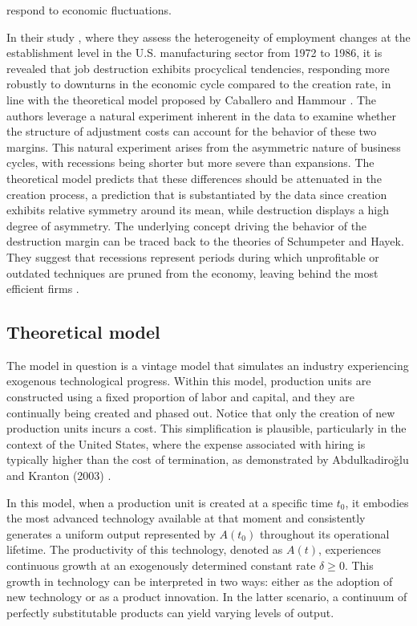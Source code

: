 \documentclass[12pt]{article}
\begin{document}
respond to economic fluctuations.
\par
In their study \cite{DavHalt92}, where they assess the heterogeneity of employment changes at the establishment level in
the U.S. manufacturing sector from 1972 to 1986, it is revealed that job destruction exhibits procyclical tendencies,
responding more robustly to downturns in the economic cycle compared to the creation rate, in line with the theoretical
model proposed by Caballero and Hammour \cite{CabHarm94}. The authors leverage a natural experiment inherent in the data
to examine whether the structure of adjustment costs can account for the behavior of these two margins. This natural
experiment arises from the asymmetric nature of business cycles, with recessions being shorter but more severe than
expansions. The theoretical model predicts that these differences should be attenuated in the creation process, a
prediction that is substantiated by the data since creation exhibits relative symmetry around its mean, while
destruction displays a high degree of asymmetry.
The underlying concept driving the behavior of the destruction margin can be traced back to the theories of Schumpeter
and Hayek.  They suggest that recessions represent periods during which unprofitable or outdated techniques are pruned
from the economy, leaving behind the most efficient firms \citet{HaCa07}.
\subsection{Theoretical model}
The model in question is a vintage model that simulates an industry experiencing exogenous technological progress.
Within this model, production units are constructed using a fixed proportion of labor and capital, and they are
continually being created and phased out. Notice that only the creation of new production units
incurs a cost. This simplification is plausible, particularly in the context of the United States, where the expense
associated with hiring is typically higher than the cost of termination, as demonstrated by Abdulkadiroğlu and Kranton
(2003) \cite{AbdKra03}. 
\par
In this model, when a production unit is created at a specific time \(t_0\), it embodies the most advanced technology
available at that moment and consistently generates a uniform output represented by \(A(t_0)\) throughout its
operational lifetime. The productivity of this technology, denoted as \(A(t)\), experiences continuous growth at an
exogenously determined constant rate \(\delta \ge 0 \). This growth in technology can be interpreted in two ways: either
as the adoption of new technology or as a product innovation. In the latter scenario, a continuum of perfectly
substitutable products can yield varying levels of output.
\end{document}
